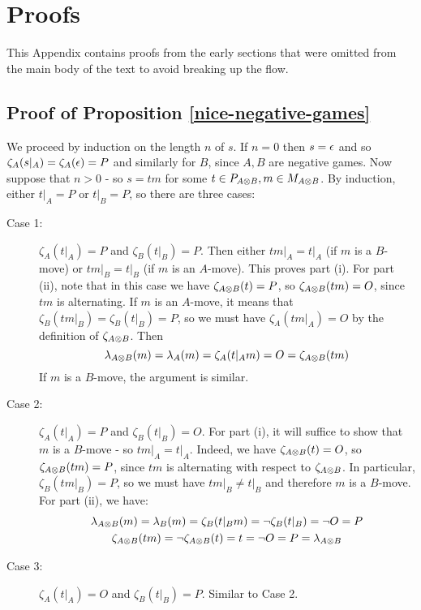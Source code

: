 \documentclass[11pt]{article} %
\begin{document}
\appendix
{}

\section{Proofs}

This Appendix contains proofs from the early sections that were omitted from the main body of the text to avoid breaking up the flow.  

\subsection{Proof of Proposition \ref{nice-negative-games}}
\label{nice-negative-games-proof}

We proceed by induction on the length $n$ of $s$.  If $n=0$ then $s=\epsilon$ and so $\zeta_A(s\vert_A)=\zeta_A(\epsilon)=P$ and similarly for $B$, since $A,B$ are negative games.  Now suppose that $n>0$ - so $s=tm$ for some $t\in P_{A\otimes B},m\in M_{A\otimes B}$.  By induction, either $t\vert_A=P$ or $t\vert_B=P$, so there are three cases:
\begin{description}
  \item[Case 1:] $\zeta_A(t\vert_A)=P$ and $\zeta_B(t\vert_B)=P$. Then either $tm\vert_A=t\vert_A$ (if $m$ is a $B$-move) or $tm\vert_B=t\vert_B$ (if $m$ is an $A$-move).  This proves part (i).  For part (ii), note that in this case we have $\zeta_{A\otimes B}(t)=P$, so $\zeta_{A\otimes B}(tm)=O$, since $tm$ is alternating.  If $m$ is an $A$-move, it means that $\zeta_B(tm\vert_B)=\zeta_B(t\vert_B)=P$, so we must have $\zeta_A(tm\vert_A)=O$ by the definition of $\zeta_{A\otimes B}$.  Then
    \[
      \lambda_{A\otimes B}(m)=\lambda_A(m)=\zeta_A(t\vert_Am)=O=\zeta_{A\otimes B}(tm)
      \]
    If $m$ is a $B$-move, the argument is similar.
  \item[Case 2:] $\zeta_A(t\vert_A)=P$ and $\zeta_B(t\vert_B)=O$.  For part (i), it will suffice to show that $m$ is a $B$-move - so $tm\vert_A=t\vert_A$.  Indeed, we have $\zeta_{A\otimes B}(t)=O$, so $\zeta_{A\otimes B}(tm)=P$, since $tm$ is alternating with respect to $\zeta_{A\otimes B}$.  In particular, $\zeta_B(tm\vert_B)=P$, so we must have $tm\vert_B\ne t\vert_B$ and therefore $m$ is a $B$-move.  For part (ii), we have:
    \begin{gather*}
      \lambda_{A\otimes B}(m)=\lambda_B(m)=\zeta_B(t\vert_Bm)=\neg\zeta_B(t\vert_B)=\neg O = P \\
      \zeta_{A\otimes B}(tm)=\neg\zeta_{A\otimes B}(t)=t = \neg O = P = \lambda_{A\otimes B}
    \end{gather*}
  \item[Case 3:] $\zeta_A(t\vert_A)=O$ and $\zeta_B(t\vert_B)=P$.  Similar to Case 2.
\end{description}
\end{document}
